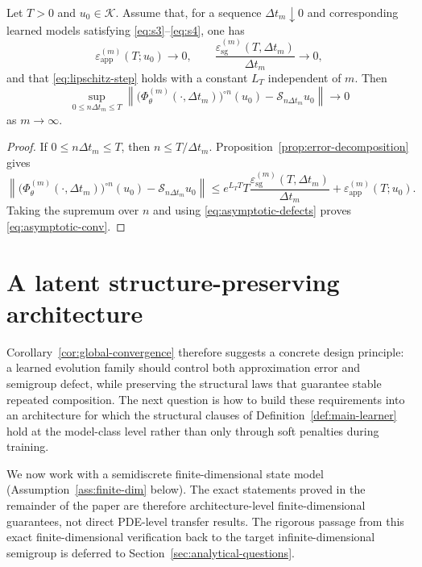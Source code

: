 \documentclass[hidelinks,review,nohypdvips,onefignum,onetabnum]{siamart220329}
\newcommand{\cS}{\mathcal{S}}
\newcommand{\cK}{\mathcal{K}}
\newcommand{\PhiT}{\Phi_{\theta}}
\newcommand{\norm}[1]{\left\lVert #1 \right\rVert}
\begin{document}
\begin{corollary}\label{cor:global-convergence}
Let \(T>0\) and \(u_0\in \cK\). Assume that, for a sequence \(\Delta t_m\downarrow 0\) and corresponding learned models satisfying \eqref{eq:s3}--\eqref{eq:s4}, one has
\begin{equation}\label{eq:asymptotic-defects}
\varepsilon_{\mathrm{app}}^{(m)}(T;u_0)\to 0, \qquad \frac{\varepsilon_{\mathrm{sg}}^{(m)}(T,\Delta t_m)}{\Delta t_m}\to 0,
\end{equation}
and that \eqref{eq:lipschitz-step} holds with a constant \(L_T\) independent of \(m\). Then
\begin{equation}\label{eq:asymptotic-conv}
\sup_{0\le n\Delta t_m\le T}\norm{\bigl(\PhiT^{(m)}(\cdot,\Delta t_m)\bigr)^{\circ n}(u_0)-\cS_{n\Delta t_m}u_0}\to 0
\end{equation}
as \(m\to \infty\).
\end{corollary}

\begin{proof}
If \(0\le n\Delta t_m\le T\), then \(n\le T/\Delta t_m\). Proposition~\ref{prop:error-decomposition} gives
\begin{equation*}
\norm{\bigl(\PhiT^{(m)}(\cdot,\Delta t_m)\bigr)^{\circ n}(u_0)-\cS_{n\Delta t_m}u_0}
\le e^{L_TT}T\frac{\varepsilon_{\mathrm{sg}}^{(m)}(T,\Delta t_m)}{\Delta t_m}+\varepsilon_{\mathrm{app}}^{(m)}(T;u_0).
\end{equation*}
Taking the supremum over \(n\) and using \eqref{eq:asymptotic-defects} proves \eqref{eq:asymptotic-conv}.
\end{proof}

\section{A latent structure-preserving architecture}\label{sec:latent-architecture}
Corollary~\ref{cor:global-convergence} therefore suggests a concrete design principle: a learned evolution family should control both approximation error and semigroup defect, while preserving the structural laws that guarantee stable repeated composition. The next question is how to build these requirements into an architecture for which the structural clauses of Definition~\ref{def:main-learner} hold at the model-class level rather than only through soft penalties during training.

We now work with a semidiscrete finite-dimensional state model (Assumption~\ref{ass:finite-dim} below). The exact statements proved in the remainder of the paper are therefore architecture-level finite-dimensional guarantees, not direct PDE-level transfer results. The rigorous passage from this exact finite-dimensional verification back to the target infinite-dimensional semigroup is deferred to Section~\ref{sec:analytical-questions}.
\end{document}
